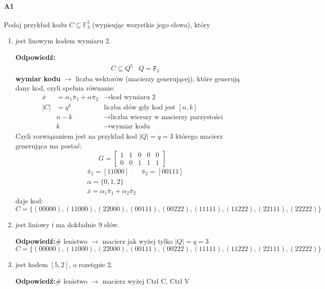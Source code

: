 \paragraph{A1} Podaj przykład kodu $C\subseteq \mathbb{F}^5_3$ (wypisując wszystkie jego słowa), który
\begin{enumerate}[label=\alph*)]
\item jest linowym kodem wymiaru 2.

\textbf{Odpowiedź:}
\begin{align*}
&C\subseteq Q^5& Q=\mathtt{F}_3
\end{align*}
\textbf{wymiar kodu} $\rightarrow$ liczba wektorów (macierzy generującej), które generują dany kod, czyli spełnia równanie:
\begin{align*}
\bar{x}&= \alpha _1\bar{\pi}_1 + \alpha\bar{\pi}_2 &\rightarrow\text{kod wymiaru 2}\\
|C|&=q^k &\text{liczba słów gdy kod jest }[n,k]\\
&n-k&\rightarrow\text{liczba wierszy w macierzy parzystości}\\
&k&\rightarrow\text{wymiar kodu}
\end{align*}
Czyli rozwiązaniem jest na przykład kod $|Q|=q=3$ którego macierz generująca ma postać:
$$G=\begin{bmatrix}
1&1&0&0&0\\0&0&1&1&1
\end{bmatrix}$$ 
\begin{align*}
&\bar{\pi}_1=[11000] &\bar{\pi}_2=[00111]\\
&\alpha =\{0,1,2\}\\
&\bar{x}=\alpha_1\bar{\pi}_1+\alpha_2\bar{\pi}_2
\end{align*}
daje kod:
$$C=\{(00000),(11000),(22000),(00111),(00222),(11111),(11222),(22111),(22222)\}$$
\item jest liniowy i ma dokładnie 9 słów.

\textbf{Odpowiedź:}\# lenistwo $\rightarrow$ macierz jak wyżej tylko $|Q|=q=3$
$$C=\{(00000),(11000),(22000),(00111),(00222),(11111),(11222),(22111),(22222)\}$$
\item jest kodem $[5, 2]$, o rozstępie 2.

\textbf{Odpowiedź:}\# lenistwo $\rightarrow$ macierz wyżej Ctrl C, Ctrl V
\end{enumerate}

